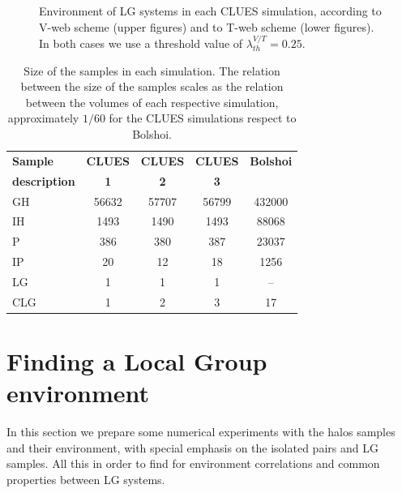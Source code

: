 \documentclass[usenatbib]{latex/mn2e}
\begin{document}
\begin{figure}
\begin{center}
\caption{\small Environment of LG systems in each CLUES simulation, 
according to V-web scheme (upper figures) and to T-web scheme (lower 
figures). In both cases we use a threshold value of $\lambda_{th}^{V/T} = 
0.25$.}
\label{fig:LG_CLUES_Environment}
\vspace{0.1 cm}
\end{center}
\end{figure}

\begin{table}
  \centering
  \begin{tabular}{l | c c c c} \hline
	\textbf{Sample}& \textbf{CLUES} & \textbf{CLUES} & \textbf{CLUES} & \textbf{Bolshoi} \\
	\textbf{description}& \textbf{1} & \textbf{2} & \textbf{3} &  \\ \hline
	GH	&	56632	&	57707	&	56799	&	432000 	\\
	IH	&	1493	&	1490	&	1493	&	88068 	\\
	P	&	386 	&	380 	&	387		&	23037 	\\
	IP	&	20	 	&	12		&	18		&	1256 	\\
	LG	&	1 		&	1 		&	1		&	-- 		\\
	CLG &	1		&	2		&	3		&	17		\\ \hline
  \end{tabular}
  
  \caption{Size of the samples in each simulation. The relation between 
  the size of the samples scales as the relation between the volumes of 
  each respective simulation, approximately $1/60$ for the CLUES 
  simulations respect to Bolshoi.}
  
  \label{Tab:Samples_Size}
\end{table}


\section{Finding a Local Group environment}
\label{sec:experiments}


In this section we prepare some numerical experiments with the halos 
samples and their environment, with special emphasis on the isolated pairs 
and LG samples. All this in order to find for environment correlations and 
common properties between LG systems.
\end{document}
